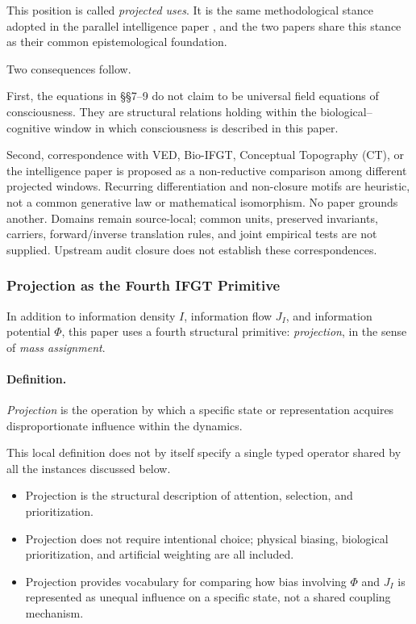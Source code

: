This position is called \emph{projected uses}. It is the same
methodological stance adopted in the parallel intelligence paper
\cite{Intelligence}, and the two papers share this stance as their
common epistemological foundation.

Two consequences follow.

First, the equations in §§7--9 do not claim to be universal field
equations of consciousness. They are structural relations holding within
the biological--cognitive window in which consciousness is described in
this paper.

Second, correspondence with VED, Bio-IFGT, Conceptual Topography (CT),
or the intelligence paper is proposed as a non-reductive comparison among
different projected windows. Recurring differentiation and non-closure
motifs are heuristic, not a common generative law or mathematical isomorphism.
No paper grounds another. Domains remain source-local; common units,
preserved invariants, carriers, forward/inverse translation rules, and joint
empirical tests are not supplied. Upstream audit closure does not establish
these correspondences.

\subsubsection{Projection as the Fourth IFGT Primitive}
\label{sec:projection-definition}

In addition to information density \(I\), information flow \(J_I\), and
information potential \(\Phi\), this paper uses a fourth structural
primitive: \emph{projection}, in the sense of \emph{mass assignment}.

\paragraph{Definition.}
\emph{Projection} is the operation by which a specific state or
representation acquires disproportionate influence within the dynamics.

This local definition does not by itself specify a single typed operator shared by all the instances discussed below.

\begin{itemize}
  \item Projection is the structural description of attention,
        selection, and prioritization.
  \item Projection does not require intentional choice; physical
        biasing, biological prioritization, and artificial weighting are
        all included.
  \item Projection provides vocabulary for comparing how bias involving
        \(\Phi\) and \(J_I\) is represented as unequal influence on a specific
        state, not a shared coupling mechanism.
\end{itemize}

